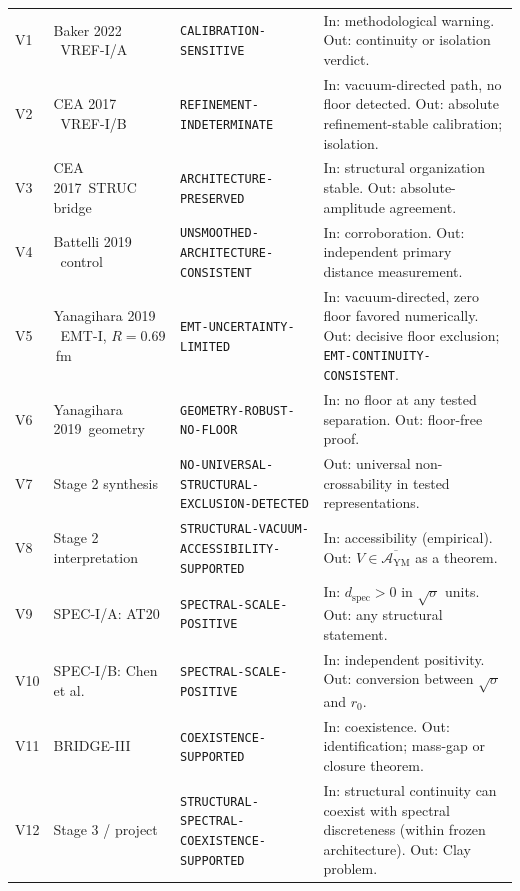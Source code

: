 \documentclass[11pt,a4paper]{article}
\theoremstyle{definition}
\theoremstyle{remark}
\newcommand{\dspec}{d_{\mathrm{spec}}}
\newcommand{\AYM}{\mathcal{A}_{\mathrm{YM}}}
\newcommand{\sqs}{\sqrt{\sigma}}
\begin{document}
{\begin{longtable}{@{}l>{\raggedright\arraybackslash}p{3.3cm}>{\raggedright\arraybackslash}p{4.7cm}>{\raggedright\arraybackslash}p{6.4cm}@{}}
V1 & Baker 2022 \cite{Baker22}\ VREF-I/A & \texttt{CALIBRATION-\allowbreak{}SENSITIVE} & In: methodological warning. Out: continuity or isolation verdict.\\[2pt]
V2 & CEA 2017 \cite{Cea17}\ VREF-I/B & \texttt{REFINEMENT-\allowbreak{}INDETERMINATE} & In: vacuum-directed path, no floor detected. Out: absolute refinement-stable calibration; isolation.\\[2pt]
V3 & CEA 2017\ STRUC bridge & \texttt{ARCHITECTURE-\allowbreak{}PRESERVED} & In: structural organization stable. Out: absolute-amplitude agreement.\\[2pt]
V4 & Battelli 2019 \cite{Battelli19}\ control & \texttt{UNSMOOTHED-\allowbreak{}ARCHITECTURE-\allowbreak{}CONSISTENT} & In: corroboration. Out: independent primary distance measurement.\\[2pt]
V5 & Yanagihara 2019 \cite{Yanagihara19}\ EMT-I, $R=0.69$\,fm & \texttt{EMT-\allowbreak{}UNCERTAINTY-\allowbreak{}LIMITED} & In: vacuum-directed, zero floor favored numerically. Out: decisive floor exclusion; \texttt{EMT-\allowbreak{}CONTINUITY-\allowbreak{}CONSISTENT}.\\[2pt]
V6 & Yanagihara 2019\ geometry & \texttt{GEOMETRY-\allowbreak{}ROBUST-\allowbreak{}NO-\allowbreak{}FLOOR} & In: no floor at any tested separation. Out: floor-free proof.\\[2pt]
V7 & Stage 2 synthesis & \texttt{NO-\allowbreak{}UNIVERSAL-\allowbreak{}STRUCTURAL-\allowbreak{}EXCLUSION-\allowbreak{}DETECTED} & Out: universal non-crossability in tested representations.\\[2pt]
V8 & Stage 2 interpretation & \texttt{STRUCTURAL-\allowbreak{}VACUUM-\allowbreak{}ACCESSIBILITY-\allowbreak{}SUPPORTED} & In: accessibility (empirical). Out: $V\in\overline{\AYM}$ as a theorem.\\[2pt]
V9 & SPEC-I/A: AT20 \cite{AT20} & \texttt{SPECTRAL-\allowbreak{}SCALE-\allowbreak{}POSITIVE} & In: $\dspec>0$ in $\sqs$ units. Out: any structural statement.\\[2pt]
V10 & SPEC-I/B: Chen et al.\ \cite{Chen06} & \texttt{SPECTRAL-\allowbreak{}SCALE-\allowbreak{}POSITIVE} & In: independent positivity. Out: conversion between $\sqs$ and $r_0$.\\[2pt]
V11 & BRIDGE-III & \texttt{COEXISTENCE-\allowbreak{}SUPPORTED} & In: coexistence. Out: identification; mass-gap or closure theorem.\\[2pt]
V12 & Stage 3 / project & \texttt{STRUCTURAL-\allowbreak{}SPECTRAL-\allowbreak{}COEXISTENCE-\allowbreak{}SUPPORTED} & In: structural continuity can coexist with spectral discreteness (within frozen architecture). Out: Clay problem.\\[2pt]
\end{longtable}}
\end{document}

